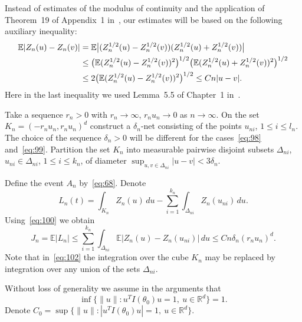 \documentclass[11pt,a4paper]{article}
\begin{document}
Instead of estimates of the modulus of continuity and the application of Theorem~19 of Appendix~1 in~\cite{10}, our estimates will be based on the following auxiliary inequality:
\begin{align}
\mathbb{E}|Z_n(u)-Z_n(v)|
&=\mathbb{E}\bigl|(Z_n^{1/2}(u)-Z_n^{1/2}(v))(Z_n^{1/2}(u)+Z_n^{1/2}(v))\bigr|\notag\\
&\le\bigl(\mathbb{E}(Z_n^{1/2}(u)-Z_n^{1/2}(v))^2\bigr)^{1/2}\bigl(\mathbb{E}(Z_n^{1/2}(u)+Z_n^{1/2}(v))^2\bigr)^{1/2}\notag\\
&\le2\bigl(\mathbb{E}(Z_n^{1/2}(u)-Z_n^{1/2}(v))^2\bigr)^{1/2}\le Cn|u-v|.
\label{eq:100}
\end{align}
Here in the last inequality we used Lemma~5.5 of Chapter~1 in~\cite{10}.

Take a sequence $r_n>0$ with $r_n\to\infty$, $r_nu_n\to0$ as $n\to\infty$. On the set $K_n=(-r_nu_n,r_nu_n)^d$ construct a $\delta_n$-net consisting of the points $u_{ni}$, $1\le i\le l_n$. The choice of the sequence $\delta_n>0$ will be different for the cases~\eqref{eq:98} and~\eqref{eq:99}. Partition the set $K_n$ into measurable pairwise disjoint subsets $\Delta_{ni}$, $u_{ni}\in\Delta_{ni}$, $1\le i\le k_n$, of diameter $\sup_{u,v\in\Delta_{ni}}|u-v|<3\delta_n$.

Define the event $A_n$ by~\eqref{eq:68}. Denote
\begin{equation}
L_n(t)=\int_{K_n}Z_n(u)\,du-\sum_{i=1}^{k_n}\int_{\Delta_{ni}}Z_n(u_{ni})\,du.
\label{eq:101}
\end{equation}
Using~\eqref{eq:100} we obtain
\begin{equation}
J_n=\mathbb{E}|L_n|\le\sum_{i=1}^{k_n}\int_{\Delta_{ni}}\mathbb{E}|Z_n(u)-Z_n(u_{ni})|\,du\le Cn\delta_n(r_nu_n)^d.
\label{eq:102}
\end{equation}
Note that in~\eqref{eq:102} the integration over the cube $K_n$ may be replaced by integration over any union of the sets $\Delta_{ni}$.

Without loss of generality we assume in the arguments that
\[
\inf\bigl\{\|u\|:u^TI(\theta_0)u=1,\ u\in\mathbb{R}^d\bigr\}=1.
\]
Denote $C_0=\sup\bigl\{\|u\|:|u^TI(\theta_0)u|=1,\ u\in\mathbb{R}^d\bigr\}$.
\end{document}
